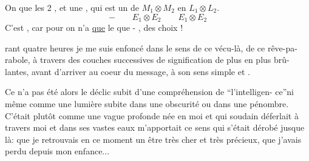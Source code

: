 On  que les 2  
 , et  une ,
qui est un  de \(M_1\otimes M_2\) en \(L_1\otimes L_2\).
\[
-\qquad E_1\otimes E_2\qquad E_1\otimes E_2
\]
C'est , car pour  on n'a  \uline{que}
le  que     -  
  ,   des choix !

rant quatre heures je me suis enfoncé dans le sens de ce vécu-là, de ce rêve-pa-\linebreak
rabole, à travers des couches successives de signification de plus en plus brû-\linebreak
lantes, avant d'arriver au coeur du message, à son sens simple et .

Ce n'a pas été alors le déclic subit d'une compréhension de ``l'intelligen-\linebreak
ce''\inserted{,}ni même comme une lumière subite dans une obscurité ou dans une pénombre.
C'était plutôt comme une vague profonde née en moi et qui soudain déferlait à
travers moi et dans ses vastes eaux m'apportait ce sens qui s'était dérobé
jusque là: que je retrouvais en ce moment un être très cher et très précieux,
que j'avais perdu depuis mon enfance...

